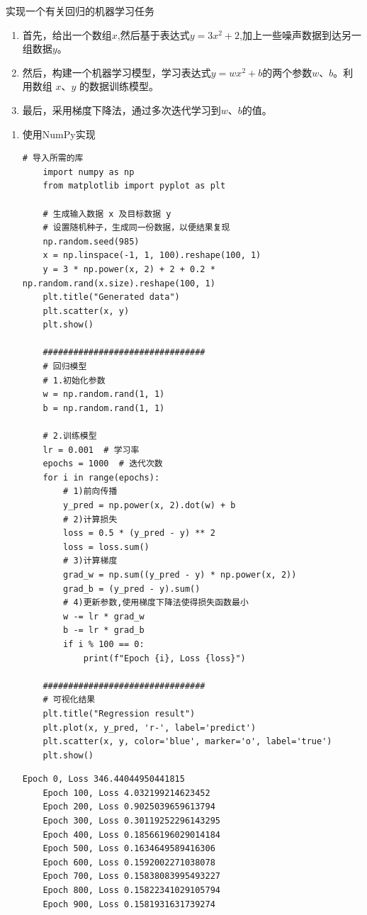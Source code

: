 \begin{example}
    \exProblem
    实现一个有关回归的机器学习任务
    \exSolution
    \begin{enumerate}[label=\arabic*)]
        \item 首先，给出一个数组$x$,然后基于表达式$y=3x^2+2$,加上一些噪声数据到达另一组数据$y$。
        \item 然后，构建一个机器学习模型，学习表达式$y=wx^2+b$的两个参数$w$、$b$。利用数组 $x$、$y$ 的数据训练模型。
        \item 最后，采用梯度下降法，通过多次迭代学习到$w$、$b$的值。
    \end{enumerate}
\end{example}

\begin{enumerate}[label=\arabic*)]
    \item 使用NumPy实现
    \begin{lstlisting}[style=pythonstyle]
    # 导入所需的库
    import numpy as np
    from matplotlib import pyplot as plt

    # 生成输入数据 x 及目标数据 y
    # 设置随机种子，生成同一份数据，以便结果复现
    np.random.seed(985)
    x = np.linspace(-1, 1, 100).reshape(100, 1)
    y = 3 * np.power(x, 2) + 2 + 0.2 * np.random.rand(x.size).reshape(100, 1)
    plt.title("Generated data")
    plt.scatter(x, y)
    plt.show()

    ################################
    # 回归模型
    # 1.初始化参数
    w = np.random.rand(1, 1)
    b = np.random.rand(1, 1)

    # 2.训练模型
    lr = 0.001  # 学习率
    epochs = 1000  # 迭代次数
    for i in range(epochs):
        # 1)前向传播
        y_pred = np.power(x, 2).dot(w) + b
        # 2)计算损失
        loss = 0.5 * (y_pred - y) ** 2
        loss = loss.sum()
        # 3)计算梯度
        grad_w = np.sum((y_pred - y) * np.power(x, 2))
        grad_b = (y_pred - y).sum()
        # 4)更新参数,使用梯度下降法使得损失函数最小
        w -= lr * grad_w
        b -= lr * grad_b
        if i % 100 == 0:
            print(f"Epoch {i}, Loss {loss}")

    ################################  
    # 可视化结果
    plt.title("Regression result")
    plt.plot(x, y_pred, 'r-', label='predict')
    plt.scatter(x, y, color='blue', marker='o', label='true')
    plt.show()
    \end{lstlisting}
    \begin{lstlisting}[style=demostyle,numbers=none]
    Epoch 0, Loss 346.44044950441815
    Epoch 100, Loss 4.032199214623452
    Epoch 200, Loss 0.9025039659613794
    Epoch 300, Loss 0.30119252296143295
    Epoch 400, Loss 0.18566196029014184
    Epoch 500, Loss 0.1634649589416306
    Epoch 600, Loss 0.1592002271038078
    Epoch 700, Loss 0.15838083995493227
    Epoch 800, Loss 0.15822341029105794
    Epoch 900, Loss 0.1581931631739274
    \end{lstlisting}


\end{enumerate}
